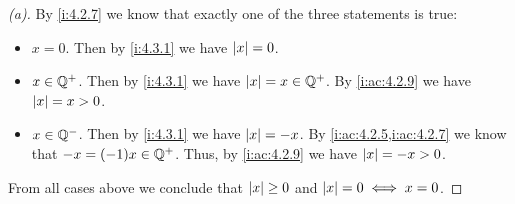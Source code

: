 \begin{proof}[(a)]
  By \cref{i:4.2.7} we know that exactly one of the three statements is true:
  \begin{itemize}
    \item \(x = 0\).
          Then by \cref{i:4.3.1} we have \(\left\lvert x\right\rvert = 0\).
    \item \(x \in \mathbb{Q}^+\).
          Then by \cref{i:4.3.1} we have \(\left\lvert x\right\rvert = x \in \mathbb{Q}^+\).
          By \cref{i:ac:4.2.9} we have \(\left\lvert x\right\rvert = x > 0\).
    \item \(x \in \mathbb{Q}^-\).
          Then by \cref{i:4.3.1} we have \(\left\lvert x\right\rvert = -x\).
          By \cref{i:ac:4.2.5,i:ac:4.2.7} we know that \(-x = (-1)x \in \mathbb{Q}^+\).
          Thus, by \cref{i:ac:4.2.9} we have \(\left\lvert x\right\rvert = -x > 0\).
  \end{itemize}
  From all cases above we conclude that \(\left\lvert x\right\rvert \geq 0\) and \(\left\lvert x\right\rvert = 0 \iff x = 0\).
\end{proof}

